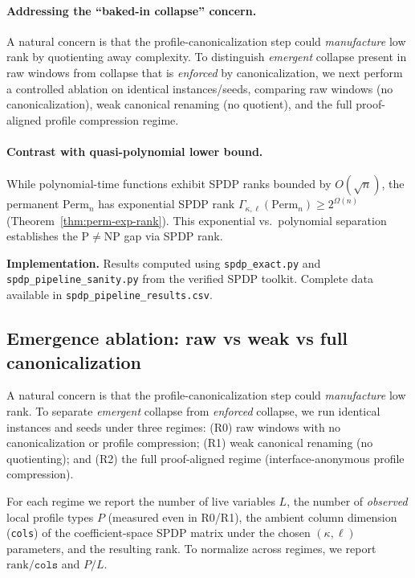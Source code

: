 \documentclass[12pt]{article}
\theoremstyle{definition}
\theoremstyle{definition}
\theoremstyle{remark}
\theoremstyle{remark}
\begin{document}
\paragraph{Addressing the ``baked-in collapse'' concern.}
A natural concern is that the profile-canonicalization step could
\emph{manufacture} low rank by quotienting away complexity. To distinguish
\emph{emergent} collapse present in raw windows from collapse that is
\emph{enforced} by canonicalization, we next perform a controlled ablation
on identical instances/seeds, comparing raw windows (no canonicalization),
weak canonical renaming (no quotient), and the full proof-aligned profile
compression regime.

\paragraph{Contrast with quasi-polynomial lower bound.} While polynomial-time functions exhibit SPDP ranks bounded by $O(\sqrt{n})$, the permanent $\mathrm{Perm}_n$ has exponential SPDP rank $\Gamma_{\kappa,\ell}(\mathrm{Perm}_n) \geq 2^{\Omega(n)}$ (Theorem~\ref{thm:perm-exp-rank}). This exponential vs.\ polynomial separation establishes the P$\neq$NP gap via SPDP rank.

\textbf{Implementation.} Results computed using \texttt{spdp\_exact.py} and \texttt{spdp\_pipeline\_sanity.py} from the verified SPDP toolkit. Complete data available in \texttt{spdp\_pipeline\_results.csv}.

\subsection{Emergence ablation: raw vs weak vs full canonicalization}
\label{subsec:emergence-ablation}

A natural concern is that the profile-canonicalization step could
\emph{manufacture} low rank. To separate \emph{emergent} collapse from
\emph{enforced} collapse, we run identical instances and seeds under
three regimes: (R0) raw windows with no canonicalization or profile
compression; (R1) weak canonical renaming (no quotienting); and (R2) the
full proof-aligned regime (interface-anonymous profile compression).

For each regime we report the number of live variables $L$, the number
of \emph{observed} local profile types $P$ (measured even in R0/R1), the
ambient column dimension (\texttt{cols}) of the coefficient-space SPDP
matrix under the chosen $(\kappa,\ell)$ parameters, and the resulting rank.
To normalize across regimes, we report $\mathrm{rank}/\texttt{cols}$ and
$P/L$.
\end{document}
